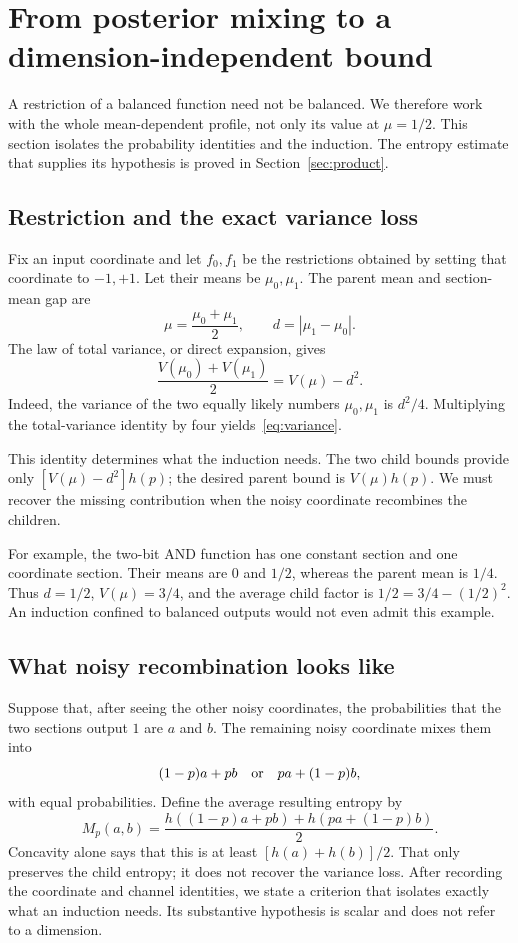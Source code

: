 \section{From posterior mixing to a dimension-independent bound}\label{sec:induction}
A restriction of a balanced function need not be balanced. We therefore work with the whole mean-dependent profile, not only its value at $\mu=1/2$. This section isolates the probability identities and the induction. The entropy estimate that supplies its hypothesis is proved in Section~\ref{sec:product}.

\subsection{Restriction and the exact variance loss}
Fix an input coordinate and let $f_0,f_1$ be the restrictions obtained by setting that coordinate to $-1,+1$. Let their means be $\mu_0,\mu_1$. The parent mean and section-mean gap are
\[
\mu=\frac{\mu_0+\mu_1}{2},\qquad d=|\mu_1-\mu_0|.
\]
The law of total variance, or direct expansion, gives
\begin{equation}\label{eq:variance}
\frac{V(\mu_0)+V(\mu_1)}2=V(\mu)-d^2.
\end{equation}
Indeed, the variance of the two equally likely numbers $\mu_0,\mu_1$ is $d^2/4$. Multiplying the total-variance identity by four yields~\eqref{eq:variance}.

This identity determines what the induction needs. The two child bounds provide only $[V(\mu)-d^2]h(p)$; the desired parent bound is $V(\mu)h(p)$. We must recover the missing contribution when the noisy coordinate recombines the children.

For example, the two-bit AND function has one constant section and one coordinate section. Their means are $0$ and $1/2$, whereas the parent mean is $1/4$. Thus $d=1/2$, $V(\mu)=3/4$, and the average child factor is $1/2=3/4-(1/2)^2$. An induction confined to balanced outputs would not even admit this example.

\subsection{What noisy recombination looks like}
Suppose that, after seeing the other noisy coordinates, the probabilities that the two sections output $1$ are $a$ and $b$. The remaining noisy coordinate mixes them into
\[
(1-p)a+pb\quad\hbox{or}\quad pa+(1-p)b,
\]
with equal probabilities. Define the average resulting entropy by
\begin{equation}\label{eq:mix}
M_p(a,b)=\frac{h((1-p)a+pb)+h(pa+(1-p)b)}2.
\end{equation}
Concavity alone says that this is at least $[h(a)+h(b)]/2$. That only preserves the child entropy; it does not recover the variance loss. After recording the coordinate and channel identities, we state a criterion that isolates exactly what an induction needs. Its substantive hypothesis is scalar and does not refer to a dimension.

